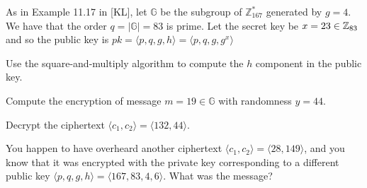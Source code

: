 \documentclass[a4paper,10pt,landscape,twocolumn]{scrartcl}
\begin{document}
\problems


\begin{exercise}
As in Example 11.17 in [KL], let $\mathbb{G}$ be the subgroup of $\mathbb{Z}_{167}^*$ generated by $g=4$. We have that the order $q=|\mathbb{G}|=83$ is prime. Let the secret key be $x=23 \in \mathbb{Z}_{83}$ and so the public key is $pk = \langle p,q,g,h \rangle = \langle p,q,g,g^x \rangle$ 
\begin{subex}
Use the square-and-multiply algorithm to compute the $h$ component in the public key.
\end{subex}
\begin{subex}
Compute the encryption of message $m=19 \in \mathbb{G}$ with randomness $y=44$.
\end{subex}
\begin{subex}
Decrypt the ciphertext $\langle c_1,c_2 \rangle = \langle 132,44 \rangle$.
\end{subex}
\begin{subex}
  You happen to have overheard another ciphertext $\langle c_1,c_2
  \rangle = \langle 28,149 \rangle$, and you know that it was
  encrypted with the private key corresponding to a different public key $\langle
  p,q,g,h \rangle = \langle 167,83,4,6 \rangle$. What was the message?
\end{subex}
\end{exercise}
\end{document}
